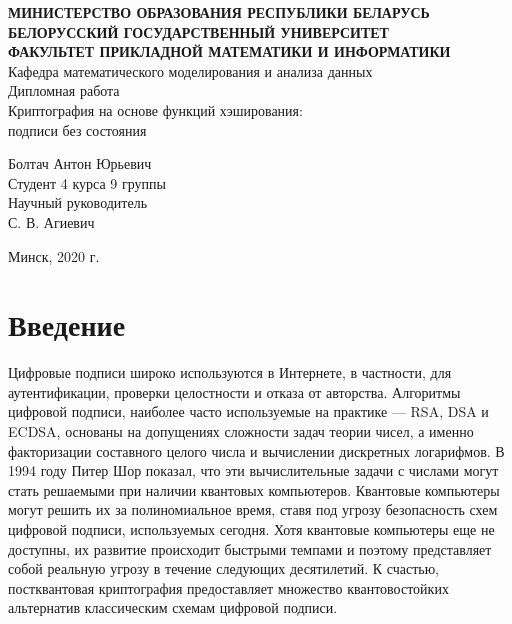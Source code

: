\documentclass[a4paper, 14pt]{extarticle}
\begin{document}

\begin{center}
    \normalsize{\textbf{МИНИСТЕРСТВО ОБРАЗОВАНИЯ РЕСПУБЛИКИ БЕЛАРУСЬ}}\\
    \hfill \break
    \normalsize{\textbf{БЕЛОРУССКИЙ ГОСУДАРСТВЕННЫЙ УНИВЕРСИТЕТ}}\\
    \hfill \break
    \small{\textbf{ФАКУЛЬТЕТ ПРИКЛАДНОЙ МАТЕМАТИКИ И ИНФОРМАТИКИ}}\\
    \hfill \break
    \large{Кафедра математического моделирования и анализа данных}\\
    \vspace{40mm}
    \normalsize{Дипломная работа}\\
    \hfill \break
    \normalsize{Криптография на основе функций хэширования:\\ подписи без состояния}\\
    \hfill \break
\end{center}

\begin{flushright}
    \vspace{20mm}
    Болтач Антон Юрьевич\\
    Студент 4 курса 9 группы\\
    Научный руководитель\\
    С. В. Агиевич\\
\end{flushright}

\vfill
\begin{center}
    Минск, 2020 г.
\end{center}
\thispagestyle{empty} %
    

\newpage

\tableofcontents
\newpage

\section*{Введение}
Цифровые подписи широко используются в Интернете, в частности, для аутентификации, проверки целостности и отказа от авторства. Алгоритмы цифровой подписи, наиболее часто используемые на практике --- RSA, DSA и ECDSA, основаны на допущениях сложности задач теории чисел, а именно факторизации составного целого числа и вычислении дискретных логарифмов. В 1994 году Питер Шор показал, что эти вычислительные задачи с числами могут стать решаемыми при наличии квантовых компьютеров. Квантовые компьютеры могут решить их за полиномиальное время, ставя под угрозу безопасность схем цифровой подписи, используемых сегодня. Хотя квантовые компьютеры еще не доступны, их развитие происходит быстрыми темпами и поэтому представляет собой реальную угрозу в течение следующих десятилетий. К счастью, постквантовая криптография предоставляет множество квантовостойких альтернатив классическим схемам цифровой подписи. 
\end{document}
